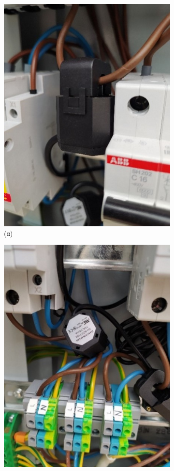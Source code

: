 \documentclass[12pt, a4paper]{report} %
\begin{document}
\begin{figure}[ht]
    \centering
    \begin{subfigure}{0.5\textwidth}
        \centering
        \includegraphics[scale=1]{Figures/split_core_a.jpg}
        \caption*{(α)}{}
    \end{subfigure}%
    \begin{subfigure}{0.5\textwidth}
        \centering
        \includegraphics[scale=1]{Figures/split_core_b.jpg}

\end{subfigure}
\end{figure}
\end{document}
